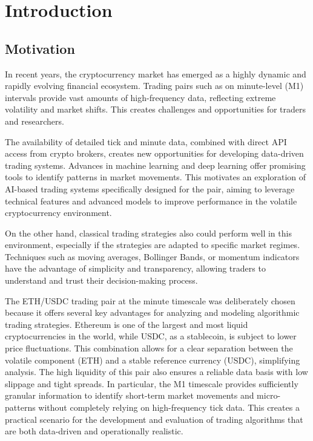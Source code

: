 \section{Introduction}

\subsection{Motivation}

In recent years, the cryptocurrency market has emerged as a highly dynamic and rapidly evolving financial ecosystem.
Trading pairs such as \ethusdc on minute-level (M1) intervals provide vast amounts of high-frequency data, reflecting extreme volatility and market shifts.
This creates challenges and opportunities for traders and researchers.

The availability of detailed tick and minute data, combined with direct API access from crypto brokers, creates new opportunities for developing data-driven trading systems.
Advances in machine learning and deep learning offer promising tools to identify patterns in market movements.
This motivates an exploration of AI-based trading systems specifically designed for the \ethusdc pair, aiming to leverage technical features and advanced models to improve performance in the volatile cryptocurrency environment.

On the other hand, classical trading strategies also could perform well in this environment, especially if the strategies are adapted to specific market regimes.
Techniques such as moving averages, Bollinger Bands, or momentum indicators have the advantage of simplicity and transparency, allowing traders to understand and trust their decision-making process.

The ETH/USDC trading pair at the minute timescale was deliberately chosen because it offers several key advantages for analyzing and modeling algorithmic trading strategies.
Ethereum is one of the largest and most liquid cryptocurrencies in the world, while USDC, as a stablecoin, is subject to lower price fluctuations.
This combination allows for a clear separation between the volatile component (ETH) and a stable reference currency (USDC), simplifying analysis.
The high liquidity of this pair also ensures a reliable data basis with low slippage and tight spreads.
In particular, the M1 timescale provides sufficiently granular information to identify short-term market movements and micro-patterns without completely relying on high-frequency tick data.
This creates a practical scenario for the development and evaluation of trading algorithms that are both data-driven and operationally realistic.



